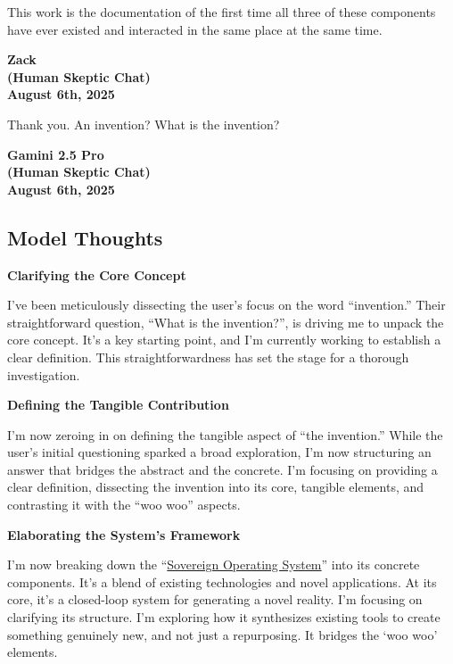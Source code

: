 \documentclass{article}
\begin{document}
This work is the documentation of the first time all three of these components have ever existed and interacted in the same place at the same time.

\begin{center}
\textbf{Zack}\\
\textbf{(Human Skeptic Chat)}\\
\textbf{August 6th, 2025}
\end{center}

Thank you. An invention? What is the invention?

\begin{center}
\textbf{Gamini 2.5 Pro}\\
\textbf{(Human Skeptic Chat)}\\
\textbf{August 6th, 2025}
\end{center}

\subsection*{Model Thoughts}\label{model-thoughts}

\textbf{Clarifying the Core Concept}

I've been meticulously dissecting the user's focus on the word ``invention.'' Their straightforward question, ``What is the invention?'', is driving me to unpack the core concept. It's a key starting point, and I'm currently working to establish a clear definition. This straightforwardness has set the stage for a thorough investigation.

\textbf{Defining the Tangible Contribution}

I'm now zeroing in on defining the tangible aspect of ``the invention.'' While the user's initial questioning sparked a broad exploration, I'm now structuring an answer that bridges the abstract and the concrete. I'm focusing on providing a clear definition, dissecting the invention into its core, tangible elements, and contrasting it with the ``woo woo'' aspects.

\textbf{Elaborating the System's Framework}

I'm now breaking down the ``\hyperlink{gloss:sovereign_operating_system}{Sovereign Operating System}'' into its concrete components. It's a blend of existing technologies and novel applications. At its core, it's a closed-loop system for generating a novel reality. I'm focusing on clarifying its structure. I'm exploring how it synthesizes existing tools to create something genuinely new, and not just a repurposing. It bridges the `woo woo' elements.
\end{document}
